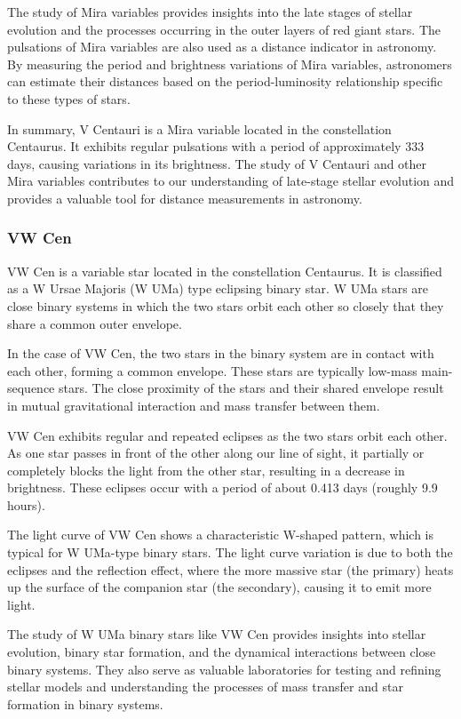 The study of Mira variables provides insights into the late stages of stellar evolution and the processes occurring in the outer layers of red giant stars. The pulsations of Mira variables are also used as a distance indicator in astronomy. By measuring the period and brightness variations of Mira variables, astronomers can estimate their distances based on the period-luminosity relationship specific to these types of stars.

In summary, V Centauri is a Mira variable located in the constellation Centaurus. It exhibits regular pulsations with a period of approximately 333 days, causing variations in its brightness. The study of V Centauri and other Mira variables contributes to our understanding of late-stage stellar evolution and provides a valuable tool for distance measurements in astronomy.

\subsubsection*{ VW Cen }
VW Cen is a variable star located in the constellation Centaurus. It is classified as a W Ursae Majoris (W UMa) type eclipsing binary star. W UMa stars are close binary systems in which the two stars orbit each other so closely that they share a common outer envelope.

In the case of VW Cen, the two stars in the binary system are in contact with each other, forming a common envelope. These stars are typically low-mass main-sequence stars. The close proximity of the stars and their shared envelope result in mutual gravitational interaction and mass transfer between them.

VW Cen exhibits regular and repeated eclipses as the two stars orbit each other. As one star passes in front of the other along our line of sight, it partially or completely blocks the light from the other star, resulting in a decrease in brightness. These eclipses occur with a period of about 0.413 days (roughly 9.9 hours).

The light curve of VW Cen shows a characteristic W-shaped pattern, which is typical for W UMa-type binary stars. The light curve variation is due to both the eclipses and the reflection effect, where the more massive star (the primary) heats up the surface of the companion star (the secondary), causing it to emit more light.

The study of W UMa binary stars like VW Cen provides insights into stellar evolution, binary star formation, and the dynamical interactions between close binary systems. They also serve as valuable laboratories for testing and refining stellar models and understanding the processes of mass transfer and star formation in binary systems.

